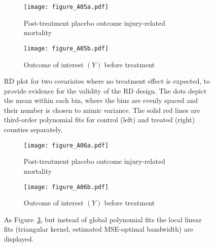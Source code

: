 \vfill
\begin{figure}
	\centering
	\begin{subfigure}[t]{0.49\textwidth}
		\texttt{[image: figure\_A05a.pdf]}
		\captionsetup{format=hang}
		\caption{Post-treatment placebo outcome injury-related mortality}
		\label{fig:rdplot_injury}
	\end{subfigure}
	\begin{subfigure}[t]{0.49\textwidth}
		\texttt{[image: figure\_A05b.pdf]}
		\caption{Outcome of interest $(Y)$ before treatment}
		\label{fig:rdplot_Y_pre}
	\end{subfigure}
	\caption{RD plot for two covariates where no treatment effect is expected, to provide evidence for the validity of the RD design.
			 The dots depict the mean within each bin, where the bins are evenly spaced and their number is chosen to mimic variance.
		 	 The solid red lines are third-order polynomial fits for control (left) and treated (right) counties separately.}
	\label{fig:rdplots_cov}
\end{figure}
\vfill
\begin{figure}
	\centering
	\begin{subfigure}[t]{0.49\textwidth}
		\texttt{[image: figure\_A06a.pdf]}
		\captionsetup{format=hang}
		\caption{Post-treatment placebo outcome injury-related mortality}
		\label{fig:llplot_injury}
	\end{subfigure}
	\begin{subfigure}[t]{0.49\textwidth}
		\texttt{[image: figure\_A06b.pdf]}
		\caption{Outcome of interest $(Y)$ before treatment}
		\label{fig:llplot_Y_pre}
	\end{subfigure}
	\caption{As Figure~\ref{fig:rdplots_cov}, but instead of global polynomial fits the local linear fits
			 (triangular kernel, estimated MSE-optimal bandwidth) are displayed.}
	\label{fig:llplots_cov}
\end{figure}
\vfill

\clearpage

